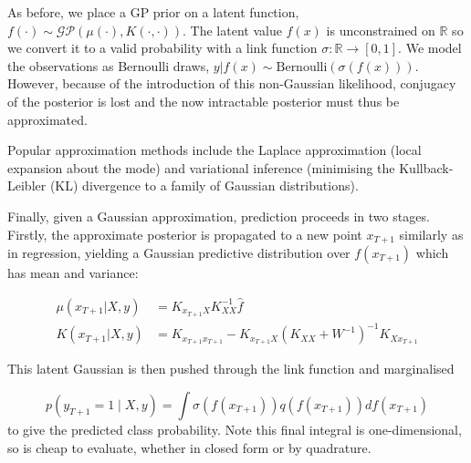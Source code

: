 \documentclass[preprint,12pt]{elsarticle}
\begin{document}
As before, we place a GP prior on a latent function, $f(\cdot) \sim \mathcal{GP} (\mu(\cdot), K(\cdot,\cdot))$. The latent value $f(x)$ is unconstrained on $\mathbb{R}$ so we convert it to a valid probability with a link function $\sigma : \mathbb{R} \rightarrow [0, 1]$. We model the observations as Bernoulli draws, $y | f(x) \sim \text{Bernoulli}(\sigma(f(x)))$. However, because of the introduction of this non-Gaussian likelihood, conjugacy of the posterior is lost and the now intractable posterior must thus be approximated.

Popular approximation methods include the Laplace approximation (local expansion about the mode) and variational inference (minimising the Kullback-Leibler (KL) divergence to a family of Gaussian distributions).

Finally, given a Gaussian approximation, prediction proceeds in two stages. Firstly, the approximate posterior is propagated to a new point $x_{T+1}$ similarly as in regression, yielding a Gaussian predictive distribution over $f(x_{T+1})$ which has mean and variance:

\begin{align*}
\mu(x_{T+1}|X,y) &= K_{x_{T+1}X} K_{XX}^{-1} \hat{f} 
\\
K(x_{T+1}|X,y) &= K_{x_{T+1}x_{T+1}} - K_{x_{T+1}X} (K_{XX} + W^{-1})^{-1} K_{X x_{T+1}}   
\end{align*}

This latent Gaussian is then pushed through the link function and marginalised

$$
p(y_{T+1}=1 \mid X, y) = \int \sigma(f(x_{T+1})) q(f(x_{T+1})) df(x_{T+1})
$$
to give the predicted class probability. Note this final integral is one-dimensional, so is cheap to evaluate, whether in closed form or by quadrature.
\end{document}
